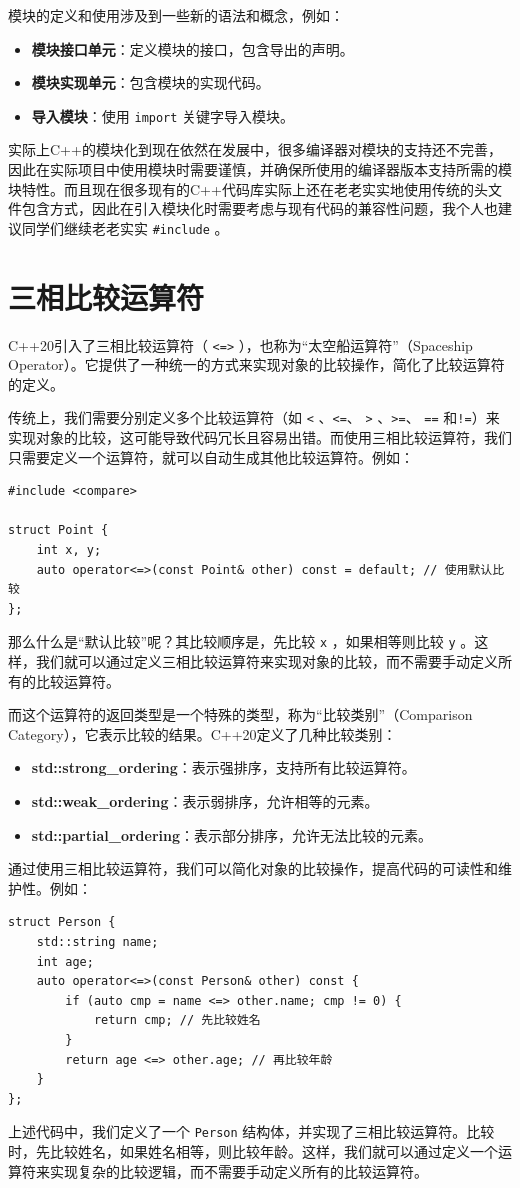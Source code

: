 模块的定义和使用涉及到一些新的语法和概念，例如：
\begin{itemize}
    \item \textbf{模块接口单元}：定义模块的接口，包含导出的声明。
    \item \textbf{模块实现单元}：包含模块的实现代码。
        \item \textbf{导入模块}：使用 \verb|import| 关键字导入模块。
\end{itemize}

实际上C++的模块化到现在依然在发展中，很多编译器对模块的支持还不完善，因此在实际项目中使用模块时需要谨慎，并确保所使用的编译器版本支持所需的模块特性。而且现在很多现有的C++代码库实际上还在老老实实地使用传统的头文件包含方式，因此在引入模块化时需要考虑与现有代码的兼容性问题，我个人也建议同学们继续老老实实 \verb|#include| 。

\section{三相比较运算符}

C++20引入了三相比较运算符（ \verb|<=>| ），也称为“太空船运算符”（Spaceship Operator）。它提供了一种统一的方式来实现对象的比较操作，简化了比较运算符的定义。

传统上，我们需要分别定义多个比较运算符（如 \verb|<| 、\verb|<=|、 \verb|>| 、\verb|>=|、 \verb|==| 和\verb|!=|）来实现对象的比较，这可能导致代码冗长且容易出错。而使用三相比较运算符，我们只需要定义一个运算符，就可以自动生成其他比较运算符。例如：
\begin{verbatim}
#include <compare>

struct Point {
    int x, y;
    auto operator<=>(const Point& other) const = default; // 使用默认比较
};
\end{verbatim}
那么什么是“默认比较”呢？其比较顺序是，先比较 \verb|x| ，如果相等则比较 \verb|y| 。这样，我们就可以通过定义三相比较运算符来实现对象的比较，而不需要手动定义所有的比较运算符。

而这个运算符的返回类型是一个特殊的类型，称为“比较类别”（Comparison Category），它表示比较的结果。C++20定义了几种比较类别：
\begin{itemize}
    \item \textbf{std::strong\_ordering}：表示强排序，支持所有比较运算符。
    \item \textbf{std::weak\_ordering}：表示弱排序，允许相等的元素。
    \item \textbf{std::partial\_ordering}：表示部分排序，允许无法比较的元素。
\end{itemize}
通过使用三相比较运算符，我们可以简化对象的比较操作，提高代码的可读性和维护性。例如：
\begin{verbatim}
struct Person {
    std::string name;
    int age;
    auto operator<=>(const Person& other) const {
        if (auto cmp = name <=> other.name; cmp != 0) {
            return cmp; // 先比较姓名
        }
        return age <=> other.age; // 再比较年龄
    }
};
\end{verbatim}
上述代码中，我们定义了一个 \verb|Person| 结构体，并实现了三相比较运算符。比较时，先比较姓名，如果姓名相等，则比较年龄。这样，我们就可以通过定义一个运算符来实现复杂的比较逻辑，而不需要手动定义所有的比较运算符。

